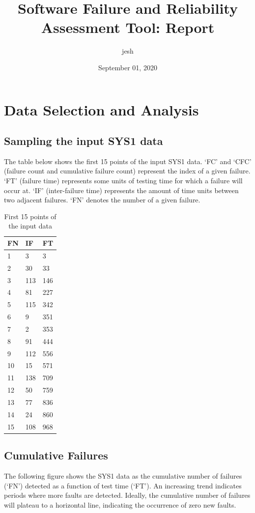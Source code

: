 \documentclass{article}
\title{Software Failure and Reliability Assessment Tool: Report}
\author{jesh}
\date{September 01, 2020}
\begin{document}
\maketitle




\section{Data Selection and Analysis}
\subsection{Sampling the input SYS1 data}
The table below shows the first 15 points of the input SYS1 data. `FC' and `CFC' (failure count and cumulative failure count) represent the index of a given failure. `FT' (failure time) represents some units of testing time for which a failure will occur at. `IF' (inter-failure time) represents the amount of time units between two adjacent failures. `FN' denotes the number of a given failure.

\begin{table}[h!]
\centering
\caption{First 15 points of the input data}
\begin{tabular}{lll}
\hline
FN & IF & FT \\ \hline
1 & 3 & 3 \\
2 & 30 & 33 \\
3 & 113 & 146 \\
4 & 81 & 227 \\
5 & 115 & 342 \\
6 & 9 & 351 \\
7 & 2 & 353 \\
8 & 91 & 444 \\
9 & 112 & 556 \\
10 & 15 & 571 \\
11 & 138 & 709 \\
12 & 50 & 759 \\
13 & 77 & 836 \\
14 & 24 & 860 \\
15 & 108 & 968 \\
\hline
\end{tabular}
\end{table}



\newpage
\subsection{Cumulative Failures}
The following figure shows the SYS1 data as the cumulative number of failures (`FN') detected as a function of test time (`FT'). An increasing trend indicates periods where more faults are detected. Ideally, the cumulative number of failures will plateau to a horizontal line, indicating the occurrence of zero new faults.
\end{document}
